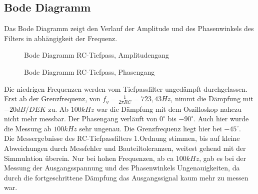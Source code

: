 \subsection{Bode Diagramm}
Das Bode Diagramm zeigt den Verlauf der Amplitude und des Phasenwinkels des Filters in abhängigkeit der Frequenz.\\
\begin{figure}[H]
  \centering
  \caption{Bode Diagramm RC-Tiefpass, Amplitudengang}
\end{figure}
\begin{figure}[H]
  \centering
  \caption{Bode Diagramm RC-Tiefpass, Phasengang}
\end{figure}
\noindent
Die niedrigen Frequenzen werden vom Tiefpassfilter ungedämpft durchgelassen. Erst ab der Grenzfrequenz, von $f_g = \frac{1}{2\pi RC} = 723,43Hz$, nimmt die Dämpfung
mit $-20dB/DEK$ zu. Ab $100kHz$ war die Dämpfung mit dem Oszilloskop nahezu nicht mehr messbar.
Der Phasengang verläuft von $0^\circ$ bis $-90^\circ$. Auch hier wurde die Messung ab $100kHz$ sehr ungenau. Die Grenzfrequenz liegt hier bei $-45^\circ$.\\ \newpage
\noindent Die Messergebnisse des RC-Tiefpassfilters 1.Ordnung stimmen, bis auf kleine Abweichungen durch Messfehler und Bauteiltoleranzen, weitest gehend mit der Simmulation überein.
Nur bei hohen Frequenzen, ab ca $100kHz$, gab es bei der Messung der Ausgangsspannung und des Phasenwinkels Ungenauigkeiten, da durch die fortgeschrittene Dämpfung das
Ausgangssignal kaum mehr zu messen war. \\ \newpage
